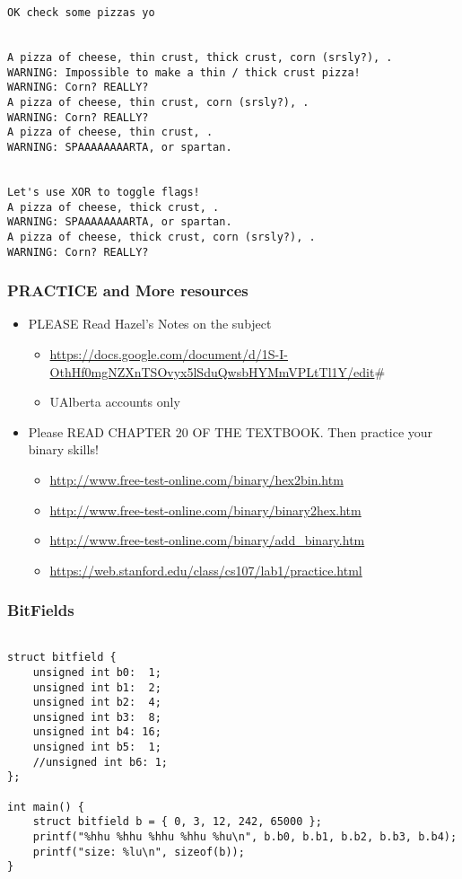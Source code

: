 \documentclass[11pt]{article}
\begin{document}
\begin{enumerate}
\begin{verbatim}
OK check some pizzas yo


A pizza of cheese, thin crust, thick crust, corn (srsly?), .
WARNING: Impossible to make a thin / thick crust pizza!
WARNING: Corn? REALLY?
A pizza of cheese, thin crust, corn (srsly?), .
WARNING: Corn? REALLY?
A pizza of cheese, thin crust, .
WARNING: SPAAAAAAAARTA, or spartan.


Let's use XOR to toggle flags!
A pizza of cheese, thick crust, .
WARNING: SPAAAAAAAARTA, or spartan.
A pizza of cheese, thick crust, corn (srsly?), .
WARNING: Corn? REALLY?
\end{verbatim}
\end{enumerate}

\subsubsection{PRACTICE and More resources}
\label{sec:org018c339}

\begin{itemize}
\item PLEASE Read Hazel's Notes on the subject 
\begin{itemize}
\item \url{https://docs.google.com/document/d/1S-I-OthHf0mgNZXnTSOvyx5lSduQwsbHYMmVPLtTl1Y/edit}\#
\item UAlberta accounts only
\end{itemize}

\item Please READ CHAPTER 20 OF THE TEXTBOOK. Then practice your binary skills!
\begin{itemize}
\item \url{http://www.free-test-online.com/binary/hex2bin.htm}
\item \url{http://www.free-test-online.com/binary/binary2hex.htm}
\item \url{http://www.free-test-online.com/binary/add\_binary.htm}
\item \url{https://web.stanford.edu/class/cs107/lab1/practice.html}
\end{itemize}
\end{itemize}


\subsubsection{BitFields}
\label{sec:orgcc27187}

\begin{verbatim}

struct bitfield {
    unsigned int b0:  1;
    unsigned int b1:  2;
    unsigned int b2:  4;
    unsigned int b3:  8;
    unsigned int b4: 16;
    unsigned int b5:  1;
    //unsigned int b6: 1;
};

int main() {
    struct bitfield b = { 0, 3, 12, 242, 65000 };
    printf("%hhu %hhu %hhu %hhu %hu\n", b.b0, b.b1, b.b2, b.b3, b.b4);
    printf("size: %lu\n", sizeof(b));
}

\end{verbatim}
\end{document}

